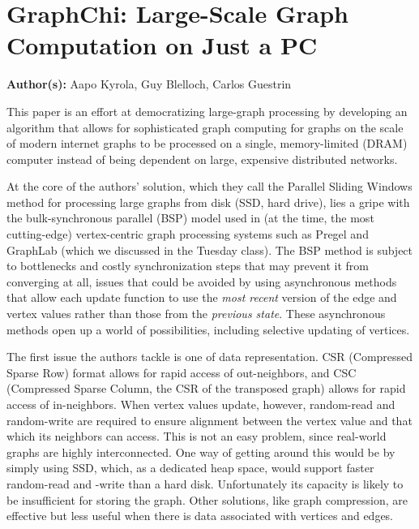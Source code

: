\section{GraphChi: Large-Scale Graph Computation on Just a PC}

\textbf{Author(s):} Aapo Kyrola, Guy Blelloch, Carlos Guestrin

This paper is an effort at democratizing large-graph processing by developing an algorithm that allows for sophisticated graph computing for graphs on the scale of modern internet graphs to be processed on a single, memory-limited (DRAM) computer instead of being dependent on large, expensive distributed networks. 

At the core of the authors' solution, which they call the Parallel Sliding Windows method for processing large graphs from disk (SSD, hard drive), lies a gripe with the bulk-synchronous parallel (BSP) model used in (at the time, the most cutting-edge) vertex-centric graph processing systems such as Pregel and GraphLab (which we discussed in the Tuesday class). The BSP method is subject to bottlenecks and costly synchronization steps that may prevent it from converging at all, issues that could be avoided by using asynchronous methods that allow each update function to use the \textit{most recent} version of the edge and vertex values rather than those from the \textit{previous state}. These asynchronous methods open up a world of possibilities, including selective updating of vertices.

The first issue the authors tackle is one of data representation. CSR (Compressed Sparse Row) format allows for rapid access of out-neighbors, and CSC (Compressed Sparse Column, the CSR of the transposed graph) allows for rapid access of in-neighbors. When vertex values update, however, random-read and random-write are required to ensure alignment between the vertex value and that which its neighbors can access. This is not an easy problem, since real-world graphs are highly interconnected. One way of getting around this would be by simply using SSD, which, as a dedicated heap space, would support faster random-read and -write than a hard disk. Unfortunately its capacity is likely to be insufficient for storing the graph. Other solutions, like graph compression, are effective but less useful when there is data associated with vertices and edges.

